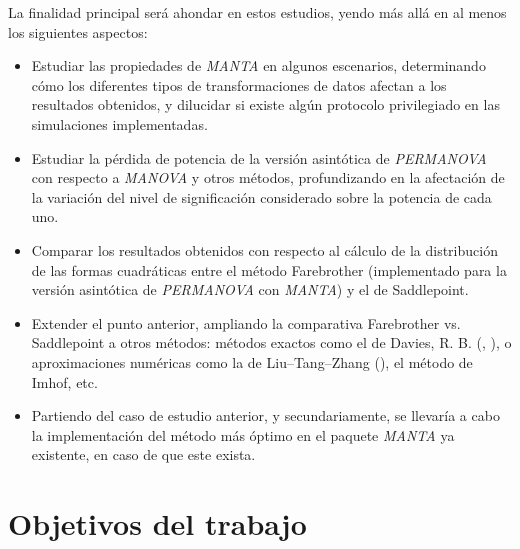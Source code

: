 \documentclass[IB,BIB]{TFUOC}%
\begin{document}
La finalidad principal será ahondar en estos estudios, yendo más allá en al menos los siguientes aspectos:

{%
\begin{itemize}
    \item Estudiar las propiedades de \textit{MANTA} en algunos escenarios, determinando cómo los diferentes tipos de transformaciones de datos afectan a los resultados obtenidos, y dilucidar si existe algún protocolo privilegiado en las simulaciones implementadas.
    \item Estudiar la pérdida de potencia de la versión asintótica de \textit{PERMANOVA} con respecto a \textit{MANOVA} y otros métodos, profundizando en la afectación de la variación del nivel de significación considerado sobre la potencia de cada uno.
    \item Comparar los resultados obtenidos con respecto al cálculo de la distribución de las formas cuadráticas entre el método Farebrother (implementado para la versión asintótica de \textit{PERMANOVA} con \textit{MANTA}) y el de Saddlepoint.
    \item Extender el punto anterior, ampliando la comparativa Farebrother vs. Saddlepoint a otros métodos: métodos exactos como el de Davies, R. B. (\cite{davies_numerical_1973}, \cite{davies_algorithm_1980}), o aproximaciones numéricas como la de Liu–Tang–Zhang (\cite{qi_genetic_2022}), el método de Imhof, etc.
    \item Partiendo del caso de estudio anterior, y secundariamente, se llevaría a cabo la implementación del método más óptimo en el paquete \textit{MANTA} ya existente, en caso de que este exista.
\end{itemize}}

\text{ }

\section{Objetivos del trabajo}
\label{sec:Objetivos del trabajo}



%
\end{document}
